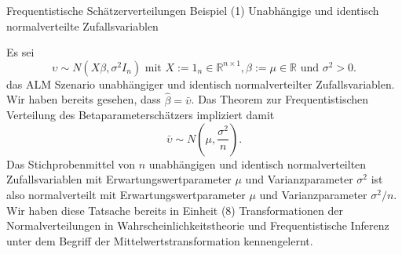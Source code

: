 \documentclass[
  8pt,
  ignorenonframetext,
]{beamer}
\begin{document}
\begin{frame}{Frequentistische Schätzerverteilungen}
\protect\hypertarget{frequentistische-schuxe4tzerverteilungen-2}{}
Beispiel (1) Unabhängige und identisch normalverteilte Zufallsvariablen
\vspace{1mm}

\small

Es sei \begin{equation}
\upsilon \sim N(X\beta,\sigma^2 I_n)
\mbox{ mit }
X := 1_n \in \mathbb{R}^{n\times 1},
\beta := \mu \in \mathbb{R}
\mbox{ und } \sigma^2 > 0.
\end{equation} das ALM Szenario unabhängiger und identisch
normalverteilter Zufallsvariablen. Wir haben bereits gesehen, dass
\(\hat{\beta} = \bar{\upsilon}\). Das Theorem zur Frequentistischen
Verteilung des Betaparameterschätzers impliziert damit \begin{equation}
\bar{\upsilon} \sim N\left(\mu, \frac{\sigma^2}{n}\right).
\end{equation} Das Stichprobenmittel von \(n\) unabhängigen und
identisch normalverteilten Zufallsvariablen mit Erwartungswertparameter
\(\mu\) und Varianzparameter \(\sigma^2\) ist also normalverteilt mit
Erwartungswertparameter \(\mu\) und Varianzparameter \(\sigma^2/n\). Wir
haben diese Tatsache bereits in Einheit (8) Transformationen der
Normalverteilungen in Wahrscheinlichkeitstheorie und Frequentistische
Inferenz unter dem Begriff der Mittelwertstransformation kennengelernt.
\end{frame}
\end{document}

